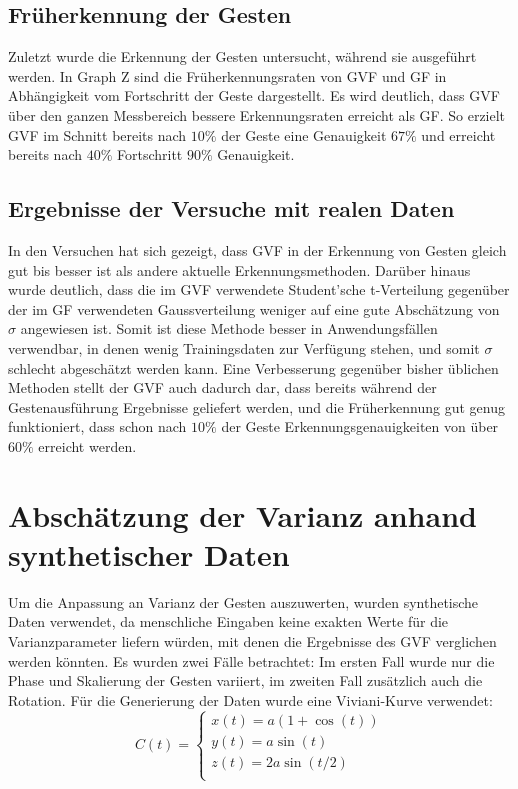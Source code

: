 \documentclass{llncs}
\begin{document}
\subsection{Früherkennung der Gesten}
Zuletzt wurde die Erkennung der Gesten untersucht, während sie ausgeführt werden. In Graph Z sind die Früherkennungsraten von GVF und GF in Abhängigkeit vom Fortschritt der Geste dargestellt. Es wird deutlich, dass GVF über den ganzen Messbereich bessere Erkennungsraten erreicht als GF. So erzielt GVF im Schnitt bereits nach $10\%$ der Geste eine Genauigkeit $67\%$ und erreicht bereits nach $40\%$ Fortschritt $90\%$ Genauigkeit.

\subsection{Ergebnisse der Versuche mit realen Daten}
In den Versuchen hat sich gezeigt, dass GVF in der Erkennung von Gesten gleich gut bis besser ist als andere aktuelle Erkennungsmethoden. Darüber hinaus wurde deutlich, dass die im GVF verwendete Student'sche t-Verteilung gegenüber der im GF verwendeten Gaussverteilung weniger auf eine gute Abschätzung von $\sigma$ angewiesen ist. Somit ist diese Methode besser in Anwendungsfällen verwendbar, in denen wenig Trainingsdaten zur Verfügung stehen, und somit $\sigma$ schlecht abgeschätzt werden kann. Eine Verbesserung gegenüber bisher üblichen Methoden stellt der GVF auch dadurch dar, dass bereits während der Gestenausführung Ergebnisse geliefert werden, und die Früherkennung gut genug funktioniert, dass schon nach $10\%$ der Geste Erkennungsgenauigkeiten von über $60\%$ erreicht werden.

\section{Abschätzung der Varianz anhand synthetischer Daten}
Um die Anpassung an Varianz der Gesten auszuwerten, wurden synthetische Daten verwendet, da menschliche Eingaben keine exakten Werte für die Varianzparameter liefern würden, mit denen die Ergebnisse des GVF verglichen werden könnten. Es wurden zwei Fälle betrachtet: Im ersten Fall wurde nur die Phase und Skalierung der Gesten variiert, im zweiten Fall zusätzlich auch die Rotation. Für die Generierung der Daten wurde eine Viviani-Kurve verwendet:
\begin{equation}
C(t)=\left\{\begin{array}{l}
x(t)=a(1+\cos(t))\\
y(t)=a\sin(t)\\
z(t)=2a\sin(t/2)\\
\end{array}\right.
\end{equation} 
\end{document}
